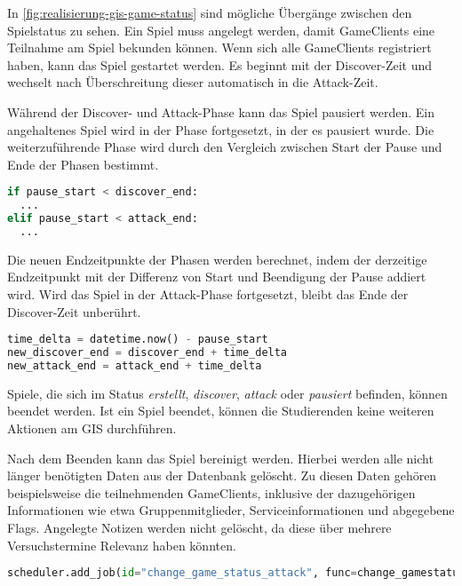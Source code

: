 In \autoref{fig:realisierung-gis-game-status} sind mögliche Übergänge zwischen den Spielstatus zu sehen. Ein Spiel muss angelegt werden, damit GameClients eine Teilnahme am Spiel bekunden können. Wenn sich alle GameClients registriert haben, kann das Spiel gestartet werden. Es beginnt mit der Discover-Zeit und wechselt nach Überschreitung dieser automatisch in die Attack-Zeit.

Während der Discover- und Attack-Phase kann das Spiel pausiert werden. Ein angehaltenes Spiel wird in der Phase fortgesetzt, in der es pausiert wurde. Die weiterzuführende Phase wird durch den Vergleich zwischen Start der Pause und Ende der Phasen bestimmt.

\begin{lstlisting}[language=Python, frame=single, caption={GIS Spiel fortsetzen}, captionpos=b, label={lst:gis-resume-game}]
if pause_start < discover_end:
  ...
elif pause_start < attack_end:
  ...
\end{lstlisting}

Die neuen Endzeitpunkte der Phasen werden berechnet, indem der derzeitige Endzeitpunkt mit der Differenz von Start und Beendigung der Pause addiert wird. Wird das Spiel in der Attack-Phase fortgesetzt, bleibt das Ende der Discover-Zeit unberührt. \\

\begin{lstlisting}[language=Python, frame=single, caption={GIS Neues Ende berechnen}, captionpos=b, label={lst:gis-pause-add-time}]
time_delta = datetime.now() - pause_start
new_discover_end = discover_end + time_delta
new_attack_end = attack_end + time_delta
\end{lstlisting}

Spiele, die sich im Status \textit{erstellt}, \textit{discover}, \textit{attack} oder \textit{pausiert} befinden, können beendet werden. Ist ein Spiel beendet, können die Studierenden keine weiteren Aktionen am GIS durchführen.

Nach dem Beenden kann das Spiel bereinigt werden. Hierbei werden alle nicht länger benötigten Daten aus der Datenbank gelöscht. Zu diesen Daten gehören beispielsweise die teilnehmenden GameClients, inklusive der dazugehörigen Informationen wie etwa Gruppenmitglieder, Serviceinformationen und abgegebene Flags. Angelegte Notizen werden nicht gelöscht, da diese über mehrere Versuchstermine Relevanz haben könnten.\\

\begin{lstlisting}[language=Python, frame=single, caption={GIS Scheduler Jobs}, captionpos=b, label={lst:gis-scheduler-jobs}]
scheduler.add_job(id="change_game_status_attack", func=change_gamestatus, trigger='date', run_date=discover_end_datetime)
\end{lstlisting}

